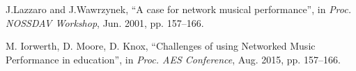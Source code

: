 
J.Lazzaro and J.Wawrzynek, ``A case for network musical performance'', in \emph{Proc. NOSSDAV Workshop}, Jun. 2001, pp. 157--166. 


M. Iorwerth, D. Moore, D. Knox, ``Challenges of using Networked Music Performance in education'', in  \emph{Proc. AES Conference}, Aug. 2015, pp. 157--166. 



